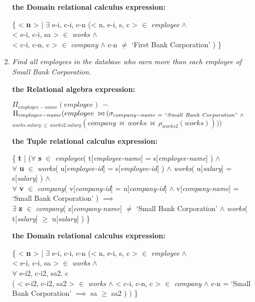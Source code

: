 \documentclass[paper=8.27in:11.69in, 14pt, DIV=calc]{scrartcl}
\begin{document}
\begin{enumerate}[label=\alph*)]
\textbf{the Domain relational calculus expression:\\}

\{ < \textbf{n} > | $\exists$ e-i, c-i, c-n (< n, e-i, s, c > $\in$ \textit{employee} $\wedge$ \\ < e-i, c-i, sa > $\in$ \textit{works} $\wedge$ \\ < c-i, c-n, c > $\in$ \textit{company} $\wedge$ c-n $\neq$ `First Bank Corporation' ) \}\\

\newpage
\item \textit{Find all employees in the database who earn more than each employee of Small Bank Corporation.\\}

\textbf{the Relational algebra expression:\\}

$\Pi_{employee-name}(employee) \ - $\\
$\Pi_{employee-name}(employee \ \bowtie (\sigma_{company-name \ = \ ``Small \ Bank \ Corporation" \ \wedge}$\\
$_{works.salary \ \leq \ works2.salary}(company \ \bowtie \ works \ \bowtie \ \rho_{works2}(works))))$

\textbf{the Tuple relational calculus expression:\\}

\{ \textbf{t} | ($\forall$ \textbf{s} $\in$ \textit{employee}( t[\textit{employee-name}] = s[\textit{employee-name}] ) $\wedge$ \\ $\forall$ \textbf{u} $\in$ \textit{works}( u[\textit{employee-id}] = s[\textit{employee-id}] ) $\wedge$ \textit{works}( u[\textit{salary}] = s[\textit{salary}] ) $\wedge$ \\ $\forall$ \textbf{v} $\in$ \textit{company}( v[\textit{company-id}] = u[\textit{company-id}] $\wedge$ v[\textit{company-name}] = `Small Bank Corporation' ) $\implies$ \\ $\exists$ \textbf{z} $\in$ \textit{company}( z[\textit{company-name}] $\neq$ `Small Bank Corporation' $\wedge$ \textit{works}( t[\textit{salary}] $\geq$ u[\textit{salary}] ) \}

\textbf{the Domain relational calculus expression:\\}

\{ < \textbf{n} > | $\exists$ e-i, c-i, c-n (< n, e-i, s, c > $\in$ \textit{employee} $\wedge$ \\ < e-i, c-i, sa > $\in$ \textit{works} $\wedge$ \\ $\forall$ e-i2, c-i2, sa2, c \\ ( < e-i2, c-i2, sa2 > $\in$ \textit{works} $\wedge$ < c-i, c-n, c > $\in$ \textit{company} $\wedge$ c-n = `Small Bank Corporation' $\implies$ sa $\geq$ sa2 ) ) \}


\end{enumerate}
\end{document}
